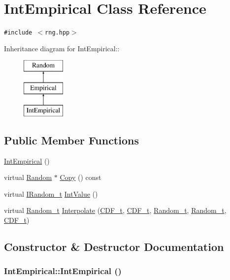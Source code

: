 \hypertarget{classIntEmpirical}{
\section{IntEmpirical Class Reference}
\label{classIntEmpirical}
}
{\tt \#include $<$rng.hpp$>$}

Inheritance diagram for IntEmpirical::\begin{figure}[H]
\begin{center}
\leavevmode
\includegraphics[height=3cm]{classIntEmpirical}
\end{center}
\end{figure}
\subsection*{Public Member Functions}
\begin{CompactItemize}
\item 
\hyperlink{classIntEmpirical_7442c6f9c589166f1d011c794afe9100}{IntEmpirical} ()
\item 
virtual \hyperlink{classRandom}{Random} $\ast$ \hyperlink{classIntEmpirical_d7e809689f9158c050b8a386eb945636}{Copy} () const 
\item 
virtual \hyperlink{rng_8hpp_eb0f2eb55a063defa69eab89c6c0f695}{IRandom\_\-t} \hyperlink{classIntEmpirical_71e5695d2c4b6b6a853cbb2992f81d48}{IntValue} ()
\item 
virtual \hyperlink{rng_8hpp_ad41e7f5d86b1109b6a6a032c86cdd3f}{Random\_\-t} \hyperlink{classIntEmpirical_9137a26418bfb0f912468c034ad1a8e0}{Interpolate} (\hyperlink{rng_8hpp_68ff29d325e1cb493f27ede4fa99c8e4}{CDF\_\-t}, \hyperlink{rng_8hpp_68ff29d325e1cb493f27ede4fa99c8e4}{CDF\_\-t}, \hyperlink{rng_8hpp_ad41e7f5d86b1109b6a6a032c86cdd3f}{Random\_\-t}, \hyperlink{rng_8hpp_ad41e7f5d86b1109b6a6a032c86cdd3f}{Random\_\-t}, \hyperlink{rng_8hpp_68ff29d325e1cb493f27ede4fa99c8e4}{CDF\_\-t})
\end{CompactItemize}


\subsection{Constructor \& Destructor Documentation}
\hypertarget{classIntEmpirical_7442c6f9c589166f1d011c794afe9100}{
\subsubsection[{IntEmpirical}]{\setlength{\rightskip}{0pt plus 5cm}IntEmpirical::IntEmpirical ()}}
\label{classIntEmpirical_7442c6f9c589166f1d011c794afe9100}




